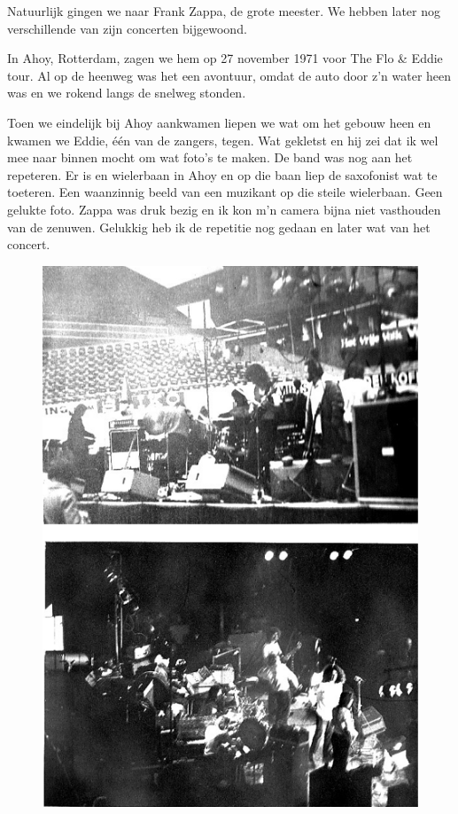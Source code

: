 \documentclass[10pt,twoside, openright]{memoir}
\begin{document}
Natuurlijk gingen we naar Frank Zappa, de grote meester. We hebben later nog verschillende van zijn concerten bijgewoond.

In Ahoy, Rotterdam, zagen we hem op 27 november 1971 voor The Flo & Eddie tour. Al op de heenweg was het een avontuur, omdat de auto door z’n water heen was en we rokend langs de snelweg stonden. 

Toen we eindelijk bij Ahoy aankwamen liepen we wat om het gebouw heen en kwamen we Eddie, één van de zangers, tegen. Wat gekletst en hij zei dat ik wel mee naar binnen mocht om wat foto's te maken. De band was nog aan het repeteren. Er is en wielerbaan in Ahoy en op die baan liep de saxofonist wat te toeteren. Een waanzinnig beeld van een muzikant op die steile wielerbaan. Geen gelukte foto. Zappa was druk bezig en ik kon m’n camera bijna niet vasthouden van de zenuwen. Gelukkig heb ik de repetitie nog gedaan en later wat van het concert.

\begin{figure}
\includegraphics[width=\textwidth]{img/ch31/zappa}
\end{figure} 
\end{document}
